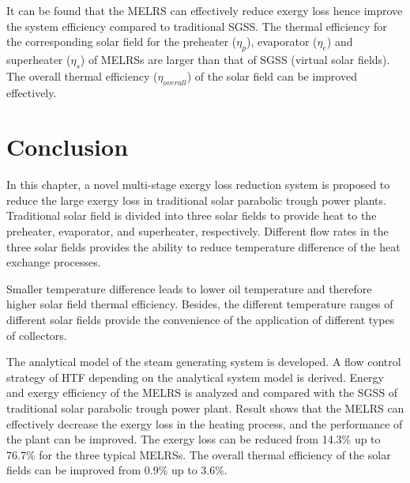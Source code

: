 It can be found that the MELRS can effectively reduce exergy loss hence improve the system efficiency compared to traditional SGSS. The thermal efficiency for the corresponding solar field for the preheater ($\eta_p$), evaporator ($\eta_e$) and superheater ($\eta_s$) of MELRSs are larger than that of SGSS (virtual solar fields).
The overall thermal efficiency ($\eta_{overall}$) of the solar field can be improved effectively.

\section{Conclusion}

In this chapter, a novel multi-stage exergy loss reduction system is proposed to reduce the large exergy loss in traditional solar parabolic trough power plants.
Traditional solar field is divided into three solar fields to provide heat to the preheater, evaporator, and superheater, respectively. Different flow rates in the three solar fields provides the ability to reduce temperature difference of the heat exchange processes.

Smaller temperature difference leads to lower oil temperature and therefore higher solar field thermal efficiency. Besides, the different temperature ranges of different solar fields provide the convenience of the application of different types of collectors.

The analytical model of the steam generating system is developed. A flow control strategy of HTF depending on the analytical system model is derived. Energy and exergy efficiency of the MELRS is analyzed and compared with the SGSS of traditional solar parabolic trough power plant. Result shows that the MELRS can effectively decrease the exergy loss in the heating process, and the performance of the plant can be improved. The exergy loss can be reduced from 14.3\% up to 76.7\% for the three typical MELRSs. The overall thermal efficiency of the solar fields can be improved from 0.9\% up to 3.6\%.